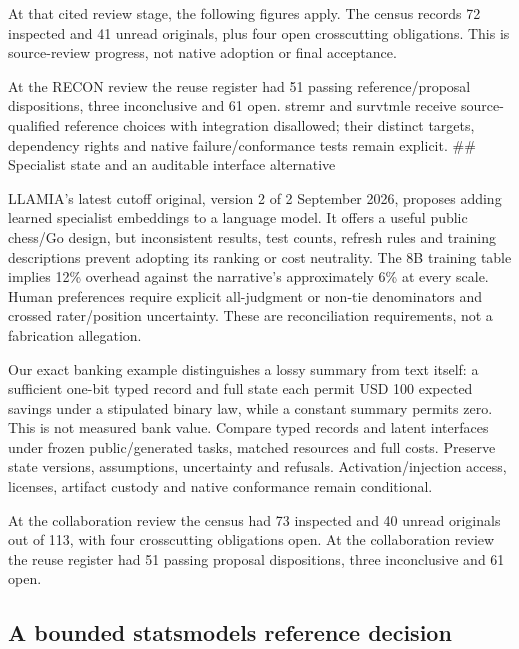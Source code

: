At that cited review stage, the following figures apply. The census
records 72 inspected and 41 unread originals, plus four open
crosscutting obligations. This is source-review progress, not native
adoption or final acceptance.
\citep{sp23recon_reader,sp23recon_progress}

At the RECON review the reuse register had 51 passing reference/proposal
dispositions, three inconclusive and 61 open. stremr and survtmle
receive source-qualified reference choices with integration disallowed;
their distinct targets, dependency rights and native failure/conformance
tests remain explicit. \citep{sp23recon_progress} \#\# Specialist state
and an auditable interface alternative

LLAMIA's latest cutoff original, version 2 of 2 September 2026, proposes
adding learned specialist embeddings to a language model. It offers a
useful public chess/Go design, but inconsistent results, test counts,
refresh rules and training descriptions prevent adopting its ranking or
cost neutrality. The 8B training table implies 12\% overhead against the
narrative's approximately 6\% at every scale. Human preferences require
explicit all-judgment or non-tie denominators and crossed rater/position
uncertainty. These are reconciliation requirements, not a fabrication
allegation.
\citep{exec24_collaboration_original,exec24_collaboration_reference}

Our exact banking example distinguishes a lossy summary from text
itself: a sufficient one-bit typed record and full state each permit USD
100 expected savings under a stipulated binary law, while a constant
summary permits zero. This is not measured bank value. Compare typed
records and latent interfaces under frozen public/generated tasks,
matched resources and full costs. Preserve state versions, assumptions,
uncertainty and refusals. Activation/injection access, licenses,
artifact custody and native conformance remain conditional.
\citep{exec24_collaboration_original,exec24_collaboration_reference}

At the collaboration review the census had 73 inspected and 40 unread
originals out of 113, with four crosscutting obligations open. At the
collaboration review the reuse register had 51 passing proposal
dispositions, three inconclusive and 61 open.
\citep{sp24collaboration_reader,sp24collaboration_progress}

\hypertarget{a-bounded-statsmodels-reference-decision}{%
\subsection{A bounded statsmodels reference
decision}\label{a-bounded-statsmodels-reference-decision}}

